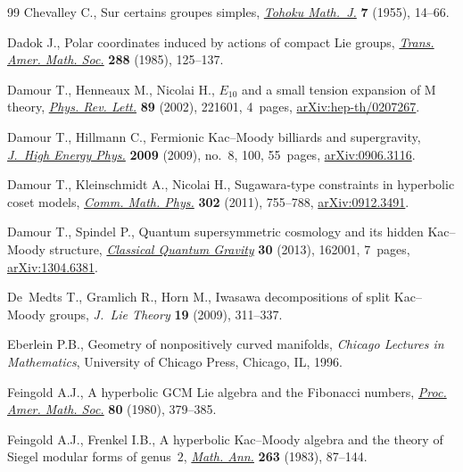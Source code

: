\documentclass[pdftex]{sigma}
\numberwithin{equation}{section}
\begin{document}
\begin{thebibliography}{99}
Chevalley C., Sur certains groupes simples, \href{https://doi.org/10.2748/tmj/1178245104}{\textit{Tohoku Math.~J.}} \textbf{7} (1955), 14--66.

Dadok J., Polar coordinates induced by actions of compact {L}ie groups,
 \href{https://doi.org/10.2307/2000430}{\textit{Trans. Amer. Math. Soc.}} \textbf{288} (1985), 125--137.

Damour T., Henneaux M., Nicolai H., {$E_{10}$} and a small tension expansion of
 {M} theory, \href{https://doi.org/10.1103/PhysRevLett.89.221601}{\textit{Phys. Rev. Lett.}} \textbf{89} (2002), 221601, 4~pages,
 \href{https://arxiv.org/abs/hep-th/0207267}{arXiv:hep-th/0207267}.

Damour T., Hillmann C., Fermionic {K}ac--{M}oody billiards and supergravity,
 \href{https://doi.org/10.1088/1126-6708/2009/08/100}{\textit{J.~High Energy Phys.}} \textbf{2009} (2009), no.~8, 100, 55~pages,
 \href{https://arxiv.org/abs/0906.3116}{arXiv:0906.3116}.

Damour T., Kleinschmidt A., Nicolai H., Sugawara-type constraints in hyperbolic
 coset models, \href{https://doi.org/10.1007/s00220-011-1188-y}{\textit{Comm. Math. Phys.}} \textbf{302} (2011), 755--788,
 \href{https://arxiv.org/abs/0912.3491}{arXiv:0912.3491}.

Damour T., Spindel P., Quantum supersymmetric cosmology and its hidden
 {K}ac--{M}oody structure, \href{https://doi.org/10.1088/0264-9381/30/16/162001}{\textit{Classical Quantum Gravity}} \textbf{30}
 (2013), 162001, 7~pages, \href{https://arxiv.org/abs/1304.6381}{arXiv:1304.6381}.

De~Medts T., Gramlich R., Horn M., Iwasawa decompositions of split
 {K}ac--{M}oody groups, \textit{J.~Lie Theory} \textbf{19} (2009), 311--337.

Eberlein P.B., Geometry of nonpositively curved manifolds, \textit{Chicago Lectures in
 Mathematics}, University of Chicago Press, Chicago, IL, 1996.

Feingold A.J., A hyperbolic {GCM} {L}ie algebra and the {F}ibonacci numbers,
 \href{https://doi.org/10.2307/2043723}{\textit{Proc. Amer. Math. Soc.}} \textbf{80} (1980), 379--385.

Feingold A.J., Frenkel I.B., A hyperbolic {K}ac--{M}oody algebra and the theory
 of {S}iegel modular forms of genus~{$2$}, \href{https://doi.org/10.1007/BF01457086}{\textit{Math. Ann.}} \textbf{263}
 (1983), 87--144.


\end{thebibliography}
\end{document}
